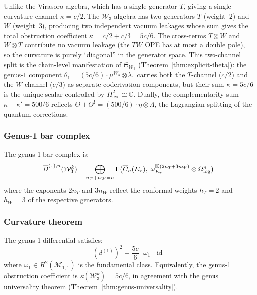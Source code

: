 Unlike the Virasoro algebra, which has a single generator $T$, giving a single
curvature channel $\kappa = c/2$.  The $\mathcal{W}_3$ algebra has two
generators $T$ (weight~$2$) and $W$ (weight~$3$), producing two
independent vacuum leakages whose sum gives the total obstruction
coefficient $\kappa = c/2 + c/3 = 5c/6$.  The cross-terms
$T \otimes W$ and $W \otimes T$ contribute no vacuum leakage
(the $TW$ OPE has at most a double pole), so the curvature is
purely ``diagonal'' in the generator space.
This two-channel split is the chain-level manifestation of
$\Theta_{\mathcal{W}_3}$ (Theorem~\ref{thm:explicit-theta}):
the genus-$1$ component $\theta_1 = (5c/6) \cdot \mu^{W_3}
\otimes \lambda_1$ carries both the $T$-channel ($c/2$) and the
$W$-channel ($c/3$) as separate coderivation components,
but their sum $\kappa = 5c/6$ is the unique scalar
controlled by $H^2_{\mathrm{cyc}} \cong \mathbb{C}$.
Dually, the complementarity sum $\kappa + \kappa' = 500/6$
reflects $\Theta + \Theta^! = (500/6) \cdot \eta \otimes \Lambda$,
the Lagrangian splitting of the quantum corrections.

\subsubsection{Genus-1 bar complex}

The genus-1 bar complex is:
\begin{equation}\label{eq:w3-genus1-bar}
\overline{B}^{(1),n}(\mathcal{W}_3^k) = \bigoplus_{n_T + n_W = n}
  \Gamma\bigl(\overline{C}_n(E_\tau),\;
  \omega_{E_\tau}^{\boxtimes(2n_T + 3n_W)} \otimes \Omega^n_{\log}\bigr)
\end{equation}
where the exponents $2n_T$ and $3n_W$ reflect the conformal weights
$h_T = 2$ and $h_W = 3$ of the respective generators.

\subsubsection{Curvature theorem}

\begin{theorem}
\label{thm:w3-genus1-curvature}
The genus-1 differential satisfies:
\begin{equation}\label{eq:w3-genus1-dsquared}
(d^{(1)})^2 = \frac{5c}{6} \cdot \omega_1 \cdot \operatorname{id}
\end{equation}
where $\omega_1 \in H^2(\overline{\mathcal{M}}_{1,1})$ is the fundamental
class.  Equivalently, the genus-1 obstruction coefficient is
$\kappa(\mathcal{W}_3^k) = 5c/6$, in agreement with the genus universality
theorem (Theorem~\ref{thm:genus-universality}).
\end{theorem}

